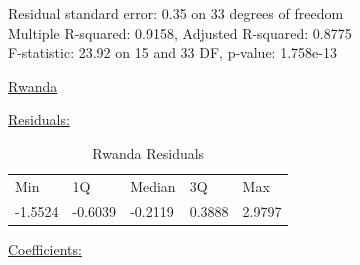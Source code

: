 \documentclass[11pt]{article}
\begin{document}
\FloatBarrier
Residual standard error: 0.35 on 33 degrees of freedom \\
Multiple R-squared:  0.9158,	Adjusted R-squared:  0.8775 \\ 
F-statistic: 23.92 on 15 and 33 DF,  p-value: 1.758e-13

\newpage

\begin{center}\underline{Rwanda} \end{center}
\underline{Residuals:}
\FloatBarrier
\begin{table}[!htbp]
\centering
\begin{tabular}{lllll}
Min     & 1Q      & Median  & 3Q     & Max    \\
-1.5524 & -0.6039 & -0.2119 & 0.3888 & 2.9797
\end{tabular}
\caption{Rwanda Residuals}
\label{table15}
\end{table}
\FloatBarrier

\underline{Coefficients:} \\
\end{document}
